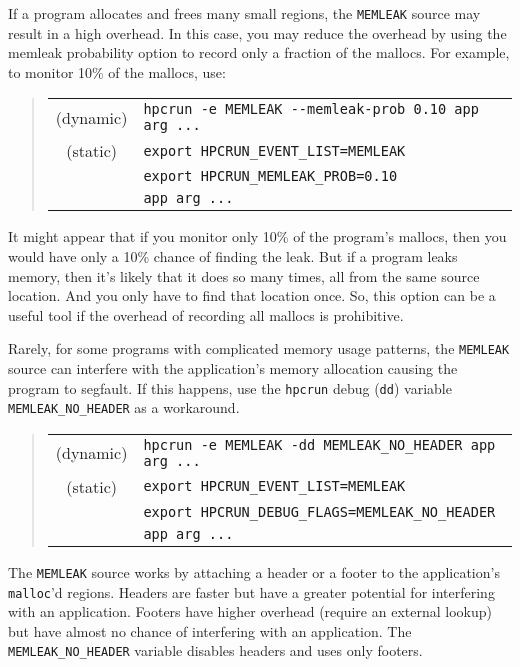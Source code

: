 If a program allocates and frees many small regions, the \verb|MEMLEAK|
source may result in a high overhead.  In this case, you may reduce
the overhead by using the memleak probability option to record only a
fraction of the mallocs.  For example, to monitor 10\% of the mallocs,
use:

\begin{quote}
\begin{tabular}{@{}cl}
(dynamic) & \verb|hpcrun -e MEMLEAK --memleak-prob 0.10 app arg ...| \\
(static)  & \verb|export HPCRUN_EVENT_LIST=MEMLEAK| \\
& \verb|export HPCRUN_MEMLEAK_PROB=0.10| \\
& \verb|app arg ...|
\end{tabular}
\end{quote}

It might appear that if you monitor only 10\% of the program's
mallocs, then you would have only a 10\% chance of finding the leak.
But if a program leaks memory, then it's likely that it does so many
times, all from the same source location.  And you only have to find
that location once.  So, this option can be a useful tool if the
overhead of recording all mallocs is prohibitive.

Rarely, for some programs with complicated memory usage patterns, the
\verb|MEMLEAK| source can interfere with the application's memory
allocation causing the program to segfault.  If this happens, use the
\verb|hpcrun| debug ({\tt dd}) variable \verb|MEMLEAK_NO_HEADER| as a
workaround.

\begin{quote}
\begin{tabular}{@{}cl}
(dynamic) & \verb|hpcrun -e MEMLEAK -dd MEMLEAK_NO_HEADER app arg ...| \\
(static)  & \verb|export HPCRUN_EVENT_LIST=MEMLEAK| \\
& \verb|export HPCRUN_DEBUG_FLAGS=MEMLEAK_NO_HEADER| \\
& \verb|app arg ...|
\end{tabular}
\end{quote}

The \verb|MEMLEAK| source works by attaching a header or a footer to
the application's \verb|malloc|'d regions.  Headers are faster but
have a greater potential for interfering with an application.  Footers
have higher overhead (require an external lookup) but have almost no
chance of interfering with an application.  The
\verb|MEMLEAK_NO_HEADER| variable disables headers and uses only
footers.


